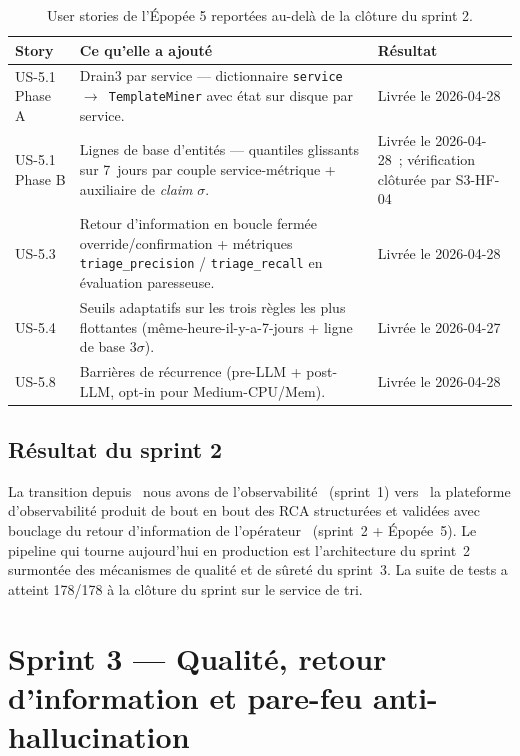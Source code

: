 \documentclass[11pt,a4paper,oneside]{report}
\begin{document}
\begin{table}[h]
\centering
\small
\begin{tabular}{p{} p{} p{}}
\toprule
\textbf{Story} & \textbf{Ce qu'elle a ajouté} & \textbf{Résultat} \\
\midrule
US-5.1 Phase A & Drain3 par service --- dictionnaire
\texttt{service $\to$ TemplateMiner} avec état sur disque par service.
& Livrée le 2026-04-28 \\
US-5.1 Phase B & Lignes de base d'entités --- quantiles glissants sur
7~jours par couple service-métrique + auxiliaire de \emph{claim}
$\sigma$. & Livrée le 2026-04-28~; vérification clôturée par S3-HF-04 \\
US-5.3 & Retour d'information en boucle fermée
override/confirmation + métriques \texttt{triage\_precision} /
\texttt{triage\_recall} en évaluation paresseuse. & Livrée le
2026-04-28 \\
US-5.4 & Seuils adaptatifs sur les trois règles les plus
flottantes (même-heure-il-y-a-7-jours + ligne de base $3\sigma$). &
Livrée le 2026-04-27 \\
US-5.8 & Barrières de récurrence (pre-LLM + post-LLM, opt-in pour
Medium-CPU/Mem). & Livrée le 2026-04-28 \\
\bottomrule
\end{tabular}
\caption{User stories de l'Épopée 5 reportées au-delà de la clôture
du sprint 2.}
\label{tab:epic5}
\end{table}

\section{Résultat du sprint 2}

\begin{winbox}[title={Livrables du sprint 2}]
La transition depuis \og~nous avons de l'observabilité~\fg{}
(sprint~1) vers \og~la plateforme d'observabilité produit de bout en
bout des RCA structurées et validées avec bouclage du retour
d'information de l'opérateur~\fg{} (sprint~2 + Épopée~5). Le
pipeline qui tourne aujourd'hui en production est l'architecture du
sprint~2 surmontée des mécanismes de qualité et de sûreté du
sprint~3. La suite de tests a atteint 178/178 à la clôture du
sprint sur le service de tri.
\end{winbox}

\chapter{Sprint 3 --- Qualité, retour d'information et pare-feu anti-hallucination}
\label{ch:sprint3}
\end{document}
